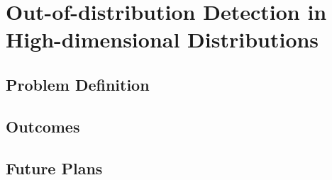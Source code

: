 \chapter{Out-of-distribution Detection in High-dimensional Distributions} \label{ch-1}

\section{Problem Definition}

\section{Outcomes}

\section{Future Plans}